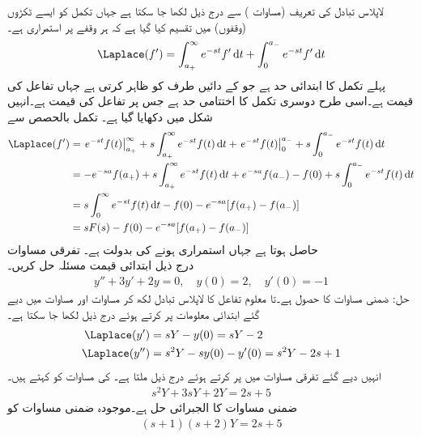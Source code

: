 لاپلاس تبادل کی تعریف (مساوات ) سے درج ذیل لکھا جا سکتا ہے جہاں تکمل کو ایسے ٹکڑوں (وقفوں) میں تقسیم کیا گیا ہے کہ ہر وقفے پر  استمراری ہے۔
\begin{align*}
\Laplace(f')=\int_{a_+}^{\infty} e^{-st}f' \dif t+\int_{0}^{a_-}e^{-st}f' \dif t
\end{align*}  
پہلے تکمل کا ابتدائی حد  ہے جو  کے دائیں طرف کو ظاہر کرتی ہے جہاں تفاعل کی قیمت   ہے۔اسی طرح دوسری تکمل کا اختتامی حد  ہے جس پر تفاعل کی قیمت  ہے۔انہیں شکل میں دکھایا گیا ہے۔  تکمل بالحصص سے
\begin{align*}
\Laplace(f')&=\left. e^{-st} f(t)\right|_{a_+}^{\infty}+s\int_{a_+}^{\infty}e^{-st}f(t)\dif t+\left. e^{-st}f(t) \right|_{0}^{a_-}+s\int_{0}^{a_-}e^{-st} f(t)\dif t\\
&=-e^{-sa}f(a_+)+s\int_{a_+}^{\infty}e^{-st}f(t)\dif t+e^{-sa}f(a_-)-f(0)+s\int_{0}^{a_-}e^{-st} f(t)\dif t\\
&=s\int_{0}^{\infty}e^{-st}f(t)\dif t -f(0)-e^{-sa}[f(a_+)-f(a_-)]\\
&=sF(s) -f(0)-e^{-sa}[f(a_+)-f(a_-)]
\end{align*}
حاصل ہوتا ہے جہاں  استمراری ہونے کی بدولت   ہے۔
\quad تفرقی مساوات\\
درج ذیل ابتدائی قیمت مسئلہ حل  کریں۔
\begin{align*}
y''+3y'+2y=0, \quad y(0)=2, \quad y'(0)=-1
\end{align*} 
حل:  ضمنی مساوات کا حصول ہے۔تا معلوم تفاعل  کا لاپلاس تبادل  لکھ کر مساوات  اور مساوات  میں دیے گئے ابتدائی معلومات پر کرتے ہوئے درج ذیل لکھا جا سکتا ہے۔
\begin{align*}
\Laplace(y')&=sY-y(0)=sY-2\\
\Laplace(y'')&=s^2Y-sy(0)-y'(0)=s^2Y-2s+1
\end{align*}
انہیں دیے گئے تفرقی مساوات میں پر کرتے ہوئے درج ذیل ملتا ہے۔ کی مساوات کو  کہتے ہیں۔
\begin{align*}
s^2Y+3sY+2Y=2s+5
\end{align*}
 ضمنی مساوات کا الجبرائی حل ہے۔موجودہ ضمنی مساوات کو
\begin{align*}
(s+1)(s+2)Y=2s+5
\end{align*}
